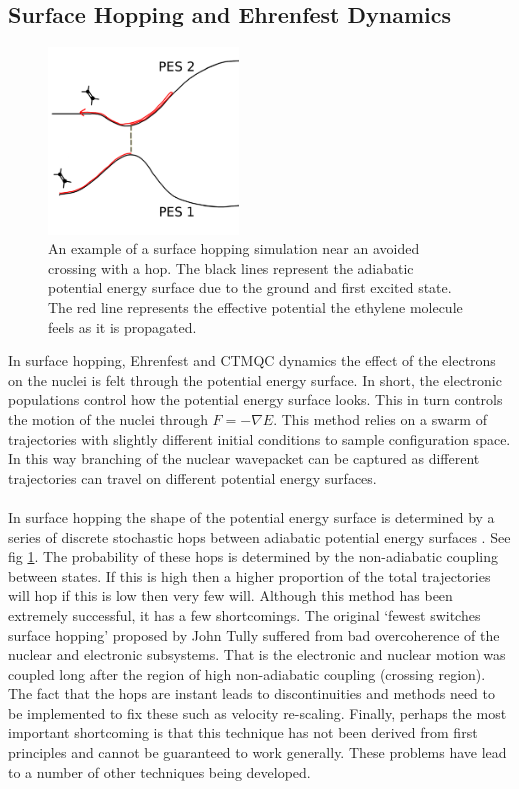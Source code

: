 \subsection{Surface Hopping and Ehrenfest Dynamics \label{sec:Ehren_SH}}
\begin{figure}
  \includegraphics[width=0.45\textwidth]{./img/SH_hop.png}
  \caption{\label{fig:SH_diag}An example of a surface hopping simulation near an avoided crossing with a hop. The black lines represent the adiabatic potential energy surface due to the ground and first excited state. The red line represents the effective potential the ethylene molecule feels as it is propagated.}
\end{figure}
In surface hopping, Ehrenfest and CTMQC dynamics the effect of the electrons on the nuclei is felt through the potential energy surface. In short, the electronic populations control how the potential energy surface looks. This in turn controls the motion of the nuclei through $F = -\nabla E$. This method relies on a swarm of trajectories with slightly different initial conditions to sample configuration space. In this way branching of the nuclear wavepacket can be captured as different trajectories can travel on different potential energy surfaces.
\\\\
In surface hopping the shape of the potential energy surface is determined by a series of discrete stochastic hops between adiabatic potential energy surfaces \cite{tully_perspective:_2012}. See fig \ref{fig:SH_diag}.  The probability of these hops is determined by the non-adiabatic coupling between states. If this is high then a higher proportion of the total trajectories will hop if this is low then very few will. Although this method has been extremely successful, it has a few shortcomings. The original `fewest switches surface hopping' proposed by John Tully suffered from bad overcoherence of the nuclear and electronic subsystems. That is the electronic and nuclear motion was coupled long after the region of high non-adiabatic coupling (crossing region). The fact that the hops are instant leads to discontinuities and methods need to be implemented to fix these such as velocity re-scaling. Finally, perhaps the most important shortcoming is that this technique has not been derived from first principles and cannot be guaranteed to work generally. These problems have lead to a number of other techniques being developed.
